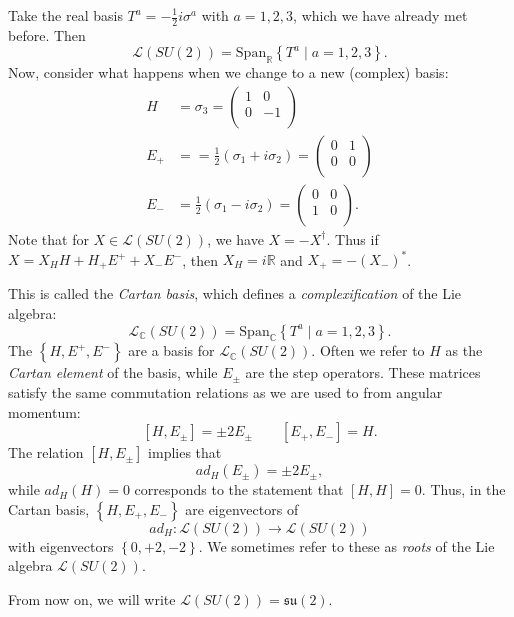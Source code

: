 Take the real basis $T^a = - \frac{1}{2} i \sigma^a$ with $a = 1,2,3$, which we have already met before.
Then
\begin{equation}
  \mathscr{L}(SU(2)) = \text{Span}_{\mathbb{R}} \left\{ T^a \mid a = 1,2,3 \right\}.
\end{equation}
Now, consider what happens when we change to a new (complex) basis:
\begin{align}
  H &= \sigma_3 =
  \begin{pmatrix}
   1 & 0 \\
   0 & -1 \\
  \end{pmatrix} \\
  E_+ &= = \frac{1}{2} (\sigma_1 + i \sigma_2) = 
  \begin{pmatrix}
   0 & 1 \\
   0 & 0 \\
  \end{pmatrix} \\
  E_- &= \frac{1}{2} (\sigma_1 - i\sigma_2) =
  \begin{pmatrix}
   0 & 0 \\
   1 & 0 \\
  \end{pmatrix}.
\end{align}
Note that for $X \in \mathscr{L}(SU(2))$, we have $X = -X^{\dagger}$.
Thus if $X = X_H H + H_+ E^+ + X_- E^-$, then $X_H = i \mathbb{R}$ and $X_+ = -(X_-)^*$.

This is called the \emph{Cartan basis}, which defines a \emph{complexification} of the Lie algebra:
\begin{equation}
  \mathscr{L}_{\mathbb{C}} (SU(2)) = \text{Span}_{\mathbb{C}} \left\{ T^a \mid a = 1,2,3 \right\}.
\end{equation}
The $\left\{ H, E^+, E^- \right\}$ are a basis for $\mathscr{L}_{\mathbb{C}}(SU(2))$.
Often we refer to $H$ as the \emph{Cartan element} of the basis, while $E_{\pm}$ are the step operators.
These matrices satisfy the same commutation relations as we are used to from angular momentum:
\begin{equation}
  \label{eq:L(su2)}
  [H, E_{\pm}] = \pm 2 E_{\pm} \qquad [E_+, E_-] = H.
\end{equation}
The relation $[H, E_{\pm}]$ implies that 
\begin{equation}
  ad_{H}(E_{\pm}) = \pm 2 E_{\pm},
\end{equation}
while $ad_H(H) = 0$ corresponds to the statement that $[H, H] = 0$.
Thus, in the Cartan basis, $\left\{ H, E_+, E_- \right\}$ are eigenvectors of
\begin{equation}
  ad_H \colon \mathscr{L}(SU(2)) \to \mathscr{L}(SU(2))
\end{equation}
with eigenvectors $\left\{ 0, +2, -2 \right\}$. We sometimes refer to these as \emph{roots} of the Lie algebra $\mathscr{L}(SU(2))$.
\begin{leftbar}
  \begin{remark}
    From now on, we will write $\mathscr{L}(SU(2)) = \mathfrak{su}(2)$.
  \end{remark}
\end{leftbar}

